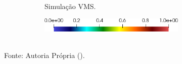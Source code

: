 \begin{figure}[h!]
\begin{subfigure}{\textwidth}
\begin{subfigure}{\textwidth}
\begin{subfigure}{.32\textwidth}
            \end{subfigure}
            \caption{Simulação VMS.}
        \end{subfigure}
        \begin{subfigure}{.5\textwidth}\centering
            \includegraphics[width=\linewidth]{Figuras/cavity-poor/legenda.png}
        \end{subfigure}
    \end{subfigure}
    \\Fonte: Autoria Própria (\the\year).
\end{figure}
